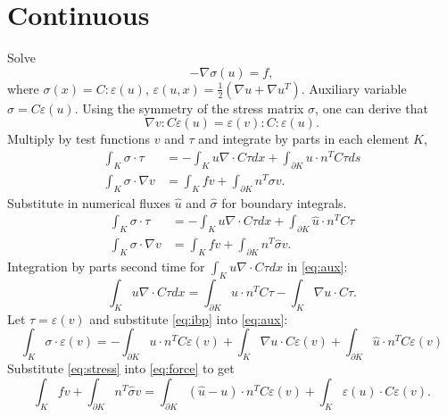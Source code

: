 \documentclass{article}
\begin{document}
\section{Continuous}
	Solve
	\[
	-\nabla\sigma(u) = f,
	\]
	where $\sigma(x) = C:\varepsilon(u)$, 
		  $\varepsilon(u,x) = \frac{1}{2}(\nabla u + \nabla u^T)$.
	Auxiliary variable $\sigma = C\varepsilon(u)$.
	Using the symmetry of the stress matrix $\sigma$, one can derive that
	\[
	\nabla v : C \varepsilon(u) = \varepsilon(v) : C : \varepsilon(u).
	\]
	Multiply by test functions $v$ and $\tau$ and integrate by parts in each element $K$,
	\begin{align}
	\int_K \sigma \cdot \tau&=-\int_Ku\nabla\cdot C\tau dx +\int_{\partial K}u \cdot n^T C\tau ds\\
	\int_K \sigma \cdot \nabla v&=\int_K fv +\int_{\partial K}n^T\sigma v.
	\end{align}
	Substitute in numerical fluxes $\hat{u}$ and $\hat{\sigma}$ for boundary integrals.
	\begin{align}
	\int_K \sigma \cdot \tau&=-\int_Ku\nabla\cdot C\tau dx +\int_{\partial K}\hat{u} \cdot  n^T C\tau \label{eq:aux}\\
	\int_K \sigma \cdot \nabla v&=\int_K fv +\int_{\partial K}n^T\hat{\sigma} v .
		\label{eq:force}
	\end{align}
	Integration by parts second time for $\int_Ku\nabla\cdot C\tau dx$ in \autoref{eq:aux}:
	\begin{equation}
	\int_Ku\nabla\cdot C\tau dx=\int_{\partial K}u \cdot n^TC\tau-\int_K\nabla u\cdot C\tau.
	\label{eq:ibp}
	\end{equation}
	Let $\tau=\varepsilon(v)$ and substitute \autoref{eq:ibp} into \autoref{eq:aux}:
	\begin{equation}
	\int_K \sigma \cdot \varepsilon(v) = -\int_{\partial K}u \cdot n^TC\varepsilon(v)+\int_K\nabla u\cdot C \varepsilon(v) +\int_{\partial K}\hat{u} \cdot n^TC\varepsilon(v)
	\label{eq:stress}
	\end{equation}
	Substitute \autoref{eq:stress} into \autoref{eq:force} to get
	\begin{equation}
	\int_K fv + \int_{\partial K}n^T\hat{\sigma}v
	= \int_{\partial K}(\hat{u}-u)\cdot n^TC \varepsilon(v)+\int_K\varepsilon(u) \cdot C\varepsilon(v).
	\end{equation}
		
\end{document}
